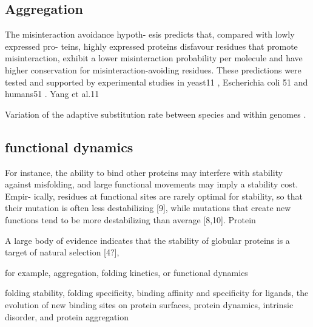 \subsection{Aggregation}

The misinteraction avoidance hypoth- esis predicts that, compared with lowly expressed pro- teins, highly expressed proteins disfavour residues that promote misinteraction, exhibit a lower misinteraction probability per molecule and have higher conservation for misinteraction-avoiding residues. These predictions were tested and supported by experimental studies in yeast11
, Escherichia coli 51 and humans51 . Yang et al.11

Variation of the adaptive \gls{substitution} rate between species and within genomes \citep{Moutinho2019}.


\subsection{functional dynamics}


For instance, the ability to bind other proteins may interfere with stability against misfolding, and large functional movements may imply a stability cost. Empir- ically, residues at functional sites are rarely optimal for stability, so that their mutation is often less destabilizing [9], while mutations that create new functions tend to be more destabilizing than average [8,10].
Protein

A large body of evidence indicates that the stability of globular proteins is a target of natural selection [4?], \citep{Sikosek2014} 
 
for example, aggregation, folding kinetics, or functional dynamics \citep{Bastolla2017}

folding stability, folding specificity, binding affinity and specificity for ligands, the evolution of new binding sites on protein surfaces, protein dynamics, intrinsic disorder, and protein aggregation \citep{Chi2016}